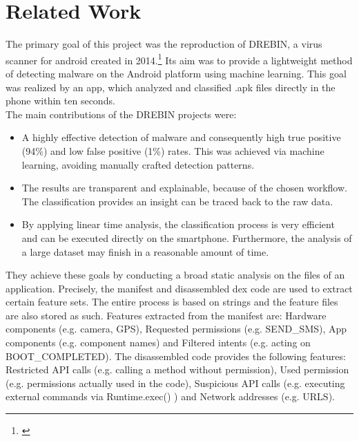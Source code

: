 \section{Related Work}

The primary goal of this project was the reproduction of DREBIN, a
virus scanner for android created in 2014.\footnote{\cite{drebin}}
Its aim was to provide a lightweight method of detecting malware on
the Android platform using machine learning. This goal was realized
by an app, which analyzed and classified .apk files directly in the
phone within ten seconds. \\
The main contributions of the DREBIN projects were: 
\begin{itemize}
\item A highly effective detection of malware and consequently high true
positive (94\%) and low false positive (1\%) rates. This was achieved
via machine learning, avoiding manually crafted detection patterns. 
\item The results are transparent and explainable, because of the chosen
workflow. The classification provides an insight can be traced back
to the raw data. 
\item By applying linear time analysis, the classification process is very
efficient and can be executed directly on the smartphone. Furthermore,
the analysis of a large dataset may finish in a reasonable amount
of time.
\end{itemize}
They achieve these goals by conducting a broad static analysis on
the files of an application. Precisely, the manifest and disassembled
dex code are used to extract certain feature sets. The entire process
is based on strings and the feature files are also stored as such.
Features extracted from the manifest are: Hardware components (e.g.
camera, GPS), Requested permissions (e.g. SEND\_SMS), App components
(e.g. component names) and Filtered intents (e.g. acting on BOOT\_COMPLETED).
The disassembled code provides the following features: Restricted
API calls (e.g. calling a method without permission), Used permission
(e.g. permissions actually used in the code), Suspicious API calls
(e.g. executing external commands via Runtime.exec() ) and Network
addresses (e.g. URLS). 


